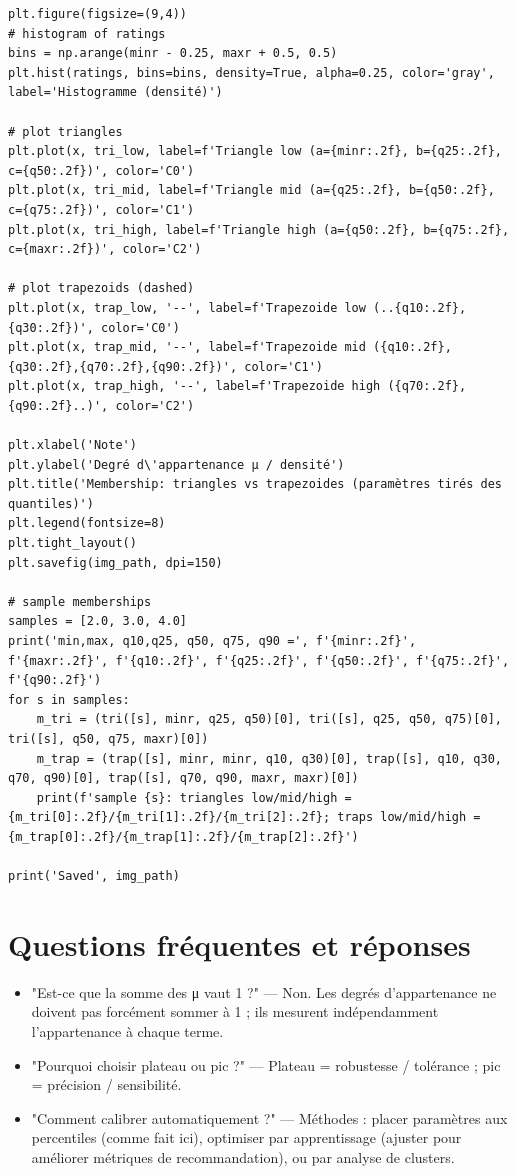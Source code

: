 \documentclass[a4paper,11pt]{article}
\begin{document}
\begin{lstlisting}
plt.figure(figsize=(9,4))
# histogram of ratings
bins = np.arange(minr - 0.25, maxr + 0.5, 0.5)
plt.hist(ratings, bins=bins, density=True, alpha=0.25, color='gray', label='Histogramme (densité)')

# plot triangles
plt.plot(x, tri_low, label=f'Triangle low (a={minr:.2f}, b={q25:.2f}, c={q50:.2f})', color='C0')
plt.plot(x, tri_mid, label=f'Triangle mid (a={q25:.2f}, b={q50:.2f}, c={q75:.2f})', color='C1')
plt.plot(x, tri_high, label=f'Triangle high (a={q50:.2f}, b={q75:.2f}, c={maxr:.2f})', color='C2')

# plot trapezoids (dashed)
plt.plot(x, trap_low, '--', label=f'Trapezoide low (..{q10:.2f},{q30:.2f})', color='C0')
plt.plot(x, trap_mid, '--', label=f'Trapezoide mid ({q10:.2f},{q30:.2f},{q70:.2f},{q90:.2f})', color='C1')
plt.plot(x, trap_high, '--', label=f'Trapezoide high ({q70:.2f},{q90:.2f}..)', color='C2')

plt.xlabel('Note')
plt.ylabel('Degré d\'appartenance μ / densité')
plt.title('Membership: triangles vs trapezoides (paramètres tirés des quantiles)')
plt.legend(fontsize=8)
plt.tight_layout()
plt.savefig(img_path, dpi=150)

# sample memberships
samples = [2.0, 3.0, 4.0]
print('min,max, q10,q25, q50, q75, q90 =', f'{minr:.2f}', f'{maxr:.2f}', f'{q10:.2f}', f'{q25:.2f}', f'{q50:.2f}', f'{q75:.2f}', f'{q90:.2f}')
for s in samples:
    m_tri = (tri([s], minr, q25, q50)[0], tri([s], q25, q50, q75)[0], tri([s], q50, q75, maxr)[0])
    m_trap = (trap([s], minr, minr, q10, q30)[0], trap([s], q10, q30, q70, q90)[0], trap([s], q70, q90, maxr, maxr)[0])
    print(f'sample {s}: triangles low/mid/high = {m_tri[0]:.2f}/{m_tri[1]:.2f}/{m_tri[2]:.2f}; traps low/mid/high = {m_trap[0]:.2f}/{m_trap[1]:.2f}/{m_trap[2]:.2f}')

print('Saved', img_path)
\end{lstlisting}

\section{Questions fréquentes et réponses}
\begin{itemize}
  \item "Est-ce que la somme des μ vaut 1 ?" — Non. Les degrés d'appartenance ne doivent pas forcément sommer à 1 ; ils mesurent indépendamment l'appartenance à chaque terme.
  \item "Pourquoi choisir plateau ou pic ?" — Plateau = robustesse / tolérance ; pic = précision / sensibilité.
  \item "Comment calibrer automatiquement ?" — Méthodes : placer paramètres aux percentiles (comme fait ici), optimiser par apprentissage (ajuster pour améliorer métriques de recommandation), ou par analyse de clusters.
\end{itemize}
\end{document}
